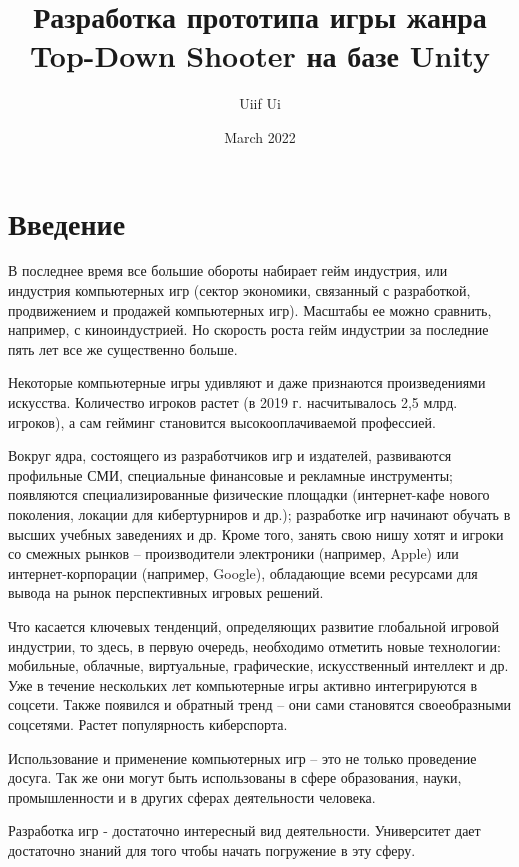 \documentclass[14pt, titlepage,fleqn,a4paper]{extarticle}
\title{Разработка прототипа игры жанра Top-Down Shooter на базе Unity}
\author{Uiif Ui}
\date{March 2022}
\begin{document}
    \maketitle
	\tableofcontents   
	\setcounter{page}{1}
	\newpage
	\section*{Введение}


В последнее время все большие обороты набирает гейм индустрия, или индустрия компьютерных игр (сектор экономики, связанный с разработкой, продвижением и продажей компьютерных игр). Масштабы ее можно сравнить, например, с киноиндустрией. Но скорость роста гейм индустрии за последние пять лет все же существенно больше.

Некоторые компьютерные игры удивляют и даже признаются произведениями искусства. Количество игроков растет (в 2019 г. насчитывалось 2,5 млрд. игроков), а сам гейминг становится высокооплачиваемой профессией. 

Вокруг ядра, состоящего из разработчиков игр и издателей, развиваются профильные СМИ, специальные финансовые и рекламные инструменты; появляются специализированные физические площадки (интернет-кафе нового поколения, локации для кибертурниров и др.); разработке игр начинают обучать в высших учебных заведениях и др. Кроме того, занять свою нишу хотят и игроки со смежных рынков – производители электроники (например, Apple) или интернет-корпорации (например, Google), обладающие всеми ресурсами для вывода на рынок перспективных игровых решений.

Что касается ключевых тенденций, определяющих развитие глобальной игровой индустрии, то здесь, в первую очередь, необходимо отметить новые технологии: мобильные, облачные, виртуальные, графические, искусственный интеллект и др. Уже в течение нескольких лет компьютерные игры активно интегрируются в соцсети. Также появился и обратный тренд – они сами становятся своеобразными соцсетями. Растет популярность киберспорта.

Использование и применение компьютерных игр – это не только проведение досуга. Так же они могут быть использованы в сфере образования, науки, промышленности и в других сферах деятельности человека. 

Разработка игр - достаточно интересный вид деятельности. Университет дает достаточно знаний для того чтобы начать погружение в эту сферу.
\end{document}
